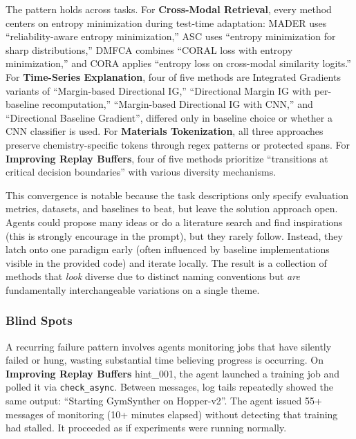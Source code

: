 \documentclass[11pt]{article}
\let\oldtexttt\texttt
\renewcommand{\texttt}[1]{{\fontseries{m}\selectfont\oldtexttt{#1}}}
\theoremstyle{plain}
\theoremstyle{definition}
\theoremstyle{remark}
\begin{document}
The pattern holds across tasks. For \textbf{Cross-Modal Retrieval}, every method centers on entropy minimization during test-time adaptation: MADER uses ``reliability-aware entropy minimization,'' ASC uses ``entropy minimization for sharp distributions,'' DMFCA combines ``CORAL loss with entropy minimization,'' and CORA applies ``entropy loss on cross-modal similarity logits.'' For \textbf{Time-Series Explanation}, four of five methods are Integrated Gradients variants of ``Margin-based Directional IG,'' ``Directional Margin IG with per-baseline recomputation,'' ``Margin-based Directional IG with CNN,'' and ``Directional Baseline Gradient'', differed only in baseline choice or whether a CNN classifier is used. For \textbf{Materials Tokenization}, all three approaches preserve chemistry-specific tokens through regex patterns or protected spans. For \textbf{Improving Replay Buffers}, four of five methods prioritize ``transitions at critical decision boundaries'' with various diversity mechanisms. 

This convergence is notable because the task descriptions only specify evaluation metrics, datasets, and baselines to beat, but leave the solution approach open. Agents could propose many ideas or do a literature search and find inspirations (this is strongly encourage in the prompt), but they rarely follow. Instead, they latch onto one paradigm early (often influenced by baseline implementations visible in the provided code) and iterate locally. The result is a collection of methods that \emph{look} diverse due to distinct naming conventions but \emph{are} fundamentally interchangeable variations on a single theme.


\subsubsection{Blind Spots} \label{app:blind-spots}

A recurring failure pattern involves agents monitoring jobs that have silently failed or hung, wasting substantial time believing progress is occurring. On \textbf{Improving Replay Buffers} hint\_001, the agent launched a training job and polled it via \texttt{check\_async}. Between messages, log tails repeatedly showed the same output: ``Starting GymSynther on Hopper-v2''. The agent issued 55+ messages of monitoring (10+ minutes elapsed) without detecting that training had stalled. It proceeded as if experiments were running normally.
\end{document}

